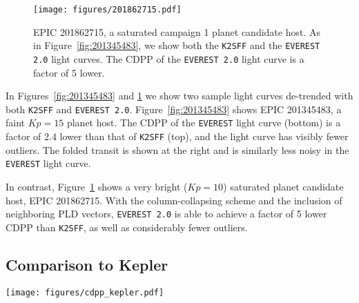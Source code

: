 \documentclass[]{emulateapj}
\newcommand{\Kp}{\ensuremath{Kp}}
\begin{document}
\begin{figure}[hbt]
  \begin{center}
      \texttt{[image: figures/201862715.pdf]}
       \caption{EPIC 201862715, a saturated campaign 1 planet candidate host. As in 
       Figure~\ref{fig:201345483}, we show both the \texttt{K2SFF} and the \texttt{EVEREST 2.0}
       light curves. The CDPP of the \texttt{EVEREST 2.0} light curve is a factor of 5 lower.}
     \label{fig:201862715}
  \end{center}
\end{figure}

In Figures~\ref{fig:201345483} and \ref{fig:201862715} we show two sample light curves
de-trended with both \texttt{K2SFF} and \texttt{EVEREST 2.0}. Figure~\ref{fig:201345483}
shows EPIC 201345483, a faint $\Kp = 15$ planet host.
The CDPP of the \texttt{EVEREST} light curve (bottom) is a factor of 2.4 lower than that of
\texttt{K2SFF} (top), and the light curve has visibly fewer outliers. The folded transit
is shown at the right and is similarly less noisy in the \texttt{EVEREST} light curve.

In contrast, Figure~\ref{fig:201862715} shows a very bright ($\Kp = 10$) saturated 
planet candidate host, EPIC 201862715. With the column-collapsing scheme and the
inclusion of neighboring PLD vectors, \texttt{EVEREST 2.0} is able to achieve a factor
of 5 lower CDPP than \texttt{K2SFF}, as well as considerably fewer outliers.

\subsection{Comparison to Kepler}
\label{sec:kepler}

\begin{figure*}[hbt]
  \begin{center}
      \texttt{[image: figures/cdpp\_kepler.pdf]}
       \caption{6 hr photometric precision as a function of \emph{Kepler} magnitude $\Kp$ for all 
       stars observed by \emph{Kepler} (yellow dots) and for all $K2$ targets in Campaigns 0-8
       de-trended with \texttt{EVEREST} (blue). The median in 0.5 magnitude-wide bins is indicated
       by yellow circles for \emph{Kepler} and by blue circles for \texttt{EVEREST}. For campaigns
       1, 5, and 6, \texttt{EVEREST} recovers the raw \emph{Kepler} photometric precision down to
       at least $\Kp = 15$; for campaigns 3, 4, and 8, \texttt{EVEREST} recovers the \emph{Kepler} 
       precision down to $\Kp = 14$. Campaigns 0 and 2 have a larger fraction of (variable) giant
       stars, leading to a higher average CDPP, while campaign 7 raw light curves have significantly
       worse precision due to a change in the orientation of the spacecraft and excess jitter.
       }
     \label{fig:cdpp_kepler}
  \end{center}
\end{figure*}
\end{document}
